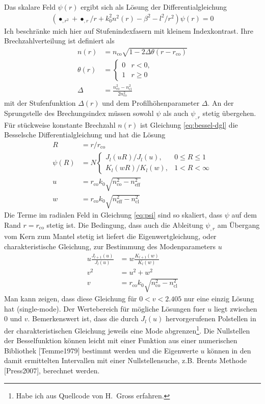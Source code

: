 \documentclass[DIV19,twocolumn]{scrartcl}
\def\({\left(}
\def\){\right)}
\newcommand{\nco}{n_\textrm{co}}
\newcommand{\rco}{r_\textrm{co}}
\newcommand{\neff}{n_\textrm{eff}}
\newcommand{\ncl}{n_\textrm{cl}}
\begin{document}
Das skalare Feld $\psi(r)$ ergibt sich als L\"osung der Differentialgleichung
\begin{align}
\label{eq:bessel-dgl}
\(\bullet_{,r^2} + \bullet_{,r}/r +k_0^2 n^2(r) -\beta^2 -l^2/r^2\)\psi(r) = 0
\end{align}
Ich beschr\"anke mich hier auf Stufenindexfasern mit kleinem
Indexkontrast. Ihre Brechzahlverteilung ist definiert als
\begin{align}
n(r)&=\nco\sqrt{1-2\Delta\theta(r-\rco)} \\
\theta(r)&=\begin{cases}0 &r<0,\\ 1 & r\ge 0\end{cases} \\
\Delta &= \frac{\nco^2-\ncl^2}{2\nco^2}
\end{align}
mit der Stufenfunktion $\Delta(r)$ und dem Profilh\"ohenparameter
$\Delta$. An der Sprungstelle des Brechungsindex m\"ussen sowohl
$\psi$ als auch $\psi_{,r}$ stetig \"ubergehen. F\"ur st\"uckweise konstante Brechzahl $n(r)$ ist Gleichung \eqref{eq:bessel-dgl} die Besselsche Differentialgleichung und hat die L\"osung
\begin{align}
  R&=r/\rco\\
  \psi(R)&=N\begin{cases}
  J_l(uR)/J_l(u), & 0\le R\le 1\\
  K_l(wR)/K_l(w), & 1<R<\infty 
  \end{cases}\label{eq:psi}\\
  u &= \rco k_0 \sqrt{\nco^2-\neff^2} \\
  w &= \rco k_0 \sqrt{\neff^2-\ncl^2} 
\end{align}
Die Terme im radialen Feld in Gleichung \eqref{eq:psi} sind so
skaliert, dass $\psi$ auf dem Rand $r=\rco$ stetig ist. Die Bedingung,
dass auch die Ableitung $\psi_{,r}$ am \"Ubergang vom Kern zum Mantel
stetig ist liefert die Eigenwertgleichung, oder charakteristische
Gleichung, zur Bestimmung des Modenparameters $u$
\begin{align}
  u\frac{J_{l+1}(u)}{J_l(u)}&=w\frac{K_{l+1}(w)}{K_l(w)}\\
  v^2 &= u^2+w^2\\
  v &= \rco k_0 \sqrt{\nco^2-\ncl^2}
\end{align}
Man kann zeigen, dass diese Gleichung f\"ur $0<v<2.405$ nur eine
einzig L\"osung hat (single-mode). Der Wertebereich f\"ur m\"ogliche
L\"osungen fuer $u$ liegt zwischen 0 und $v$. Bemerkenswert ist, dass
die durch $J_l(u)$ hervorgerufenen Polstellen in der
charakteristischen Gleichung jeweils eine Mode abgrenzen\footnote{Habe
  ich aus Quellcode von H.~Gross erfahren.}. Die Nullstellen der
Besselfunktion k\"onnen leicht mit einer Funktion aus einer
numerischen Bibliothek [Temme1979] bestimmt werden und die Eigenwerte
$u$ k\"onnen in den damit ermittelten Intervallen mit einer
Nullstellensuche, z.B. Brents Methode [Press2007], berechnet werden.
\end{document}
